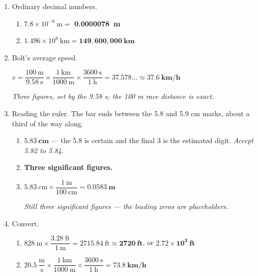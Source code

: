 \documentclass[12pt, twoside]{article}
\begin{document}
\begin{enumerate}[itemsep=0.25cm]
\begin{enumerate}[itemsep=0.15cm]
      \emph{Count the places the decimal point moves to land after the first nonzero
      digit: three groups of three gets you to the 3, so the exponent is $-9$.}
  \end{enumerate}

\item Ordinary decimal numbers.
  \begin{enumerate}[itemsep=0.15cm]
    \item $7.8 \times 10^{-6}~\text{m} = $ \textbf{\num{0.0000078}~m}
    \item $1.496 \times 10^{8}~\text{km} = \mathbf{149{,}600{,}000~\textbf{km}}$
  \end{enumerate}

\item Bolt's average speed.

  $v = \dfrac{100~\text{m}}{9.58~\text{s}} \times \dfrac{1~\text{km}}{1000~\text{m}}
  \times \dfrac{3600~\text{s}}{1~\text{h}} = 37.578\ldots
  \approx \mathbf{37.6~\textbf{km/h}}$

  \emph{Three figures, set by the 9.58 s; the 100 m race distance is exact.}

\item Reading the ruler. The bar ends between the 5.8 and 5.9 cm marks, about a third
  of the way along.
  \begin{enumerate}[itemsep=0.15cm]
    \item $\mathbf{5.83~\textbf{cm}}$ --- the 5.8 is certain and the final 3 is the
      estimated digit. \emph{Accept 5.82 to 5.84.}
    \item \textbf{Three significant figures.}
    \item $5.83~\text{cm} \times \dfrac{1~\text{m}}{100~\text{cm}}
      = \mathbf{0.0583~\textbf{m}}$

      \emph{Still three significant figures --- the leading zeros are placeholders.}
  \end{enumerate}

\item Convert.
  \begin{enumerate}[itemsep=0.15cm]
    \item $828~\text{m} \times \dfrac{3.28~\text{ft}}{1~\text{m}} = 2715.84~\text{ft}
      \approx \mathbf{2720~\textbf{ft}}$, or $\mathbf{2.72 \times 10^{3}~\textbf{ft}}$
    \item $20.5~\dfrac{\text{m}}{\text{s}} \times \dfrac{1~\text{km}}{1000~\text{m}}
      \times \dfrac{3600~\text{s}}{1~\text{h}} = \mathbf{73.8~\textbf{km/h}}$


\end{enumerate}
\end{enumerate}
\end{document}
